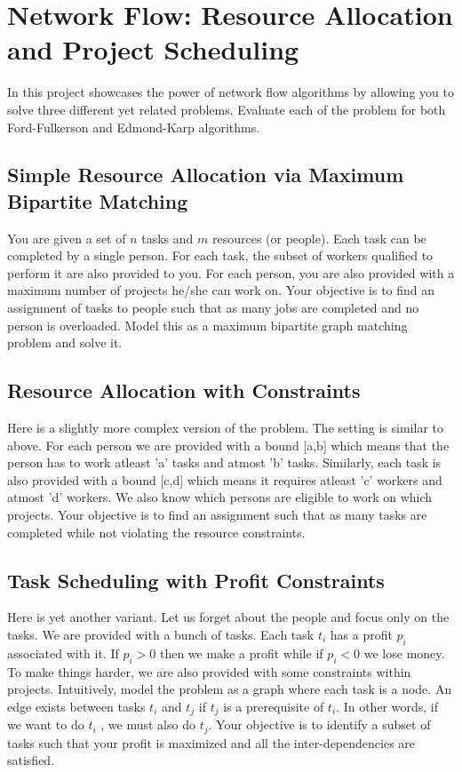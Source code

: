 \documentclass[12pt]{article}
\begin{document}
\section{Network Flow: Resource Allocation and Project Scheduling}

In this project showcases the power of network flow algorithms by allowing you to solve three different yet related problems.  Evaluate each of the problem for both Ford-Fulkerson and Edmond-Karp algorithms.

\subsection{Simple Resource Allocation via Maximum Bipartite Matching}
You are given a set of $n$ tasks and $m$ resources (or people). Each task can be completed by a single person. For each task, the subset of workers qualified to perform it are also provided to you. For each person, you are also provided with a maximum number of projects he/she can work on. Your objective is to find an assignment of tasks to people such that as many jobs are completed and no person is overloaded. Model this as a maximum bipartite graph matching problem and solve it.

\subsection{Resource Allocation with Constraints}
Here is a slightly more complex version of the problem. The setting is similar to above. For each person we are provided with a bound [a,b] which means that the person has to work atleast 'a' tasks and atmost 'b' tasks. Similarly, each task is also provided with a bound [c,d] which means it requires atleast 'c' workers and atmost 'd' workers. We also know which persons are eligible to work on which projects. Your objective is to find an assignment such that as many tasks are completed while not violating the resource constraints.

\subsection{Task Scheduling with Profit Constraints}
Here is yet another variant. Let us forget about the people and focus only on the tasks. We are provided with a bunch of tasks. Each task $t_i$ has a profit $p_i$ associated with it. If $p_i > 0$ then we make a profit while if $p_i < 0$  we lose money. To make things harder, we are also provided with some constraints within projects. Intuitively, model the problem as a graph where each task is a node. An edge exists between tasks $t_i$ and $t_j$ if $t_j$ is a prerequisite of $t_i$. In other words, if we want to do $t_i$ , we must also do $t_j$.  Your objective is to identify a subset of tasks such that your profit is maximized and all the inter-dependencies are satisfied. \\
\end{document}
